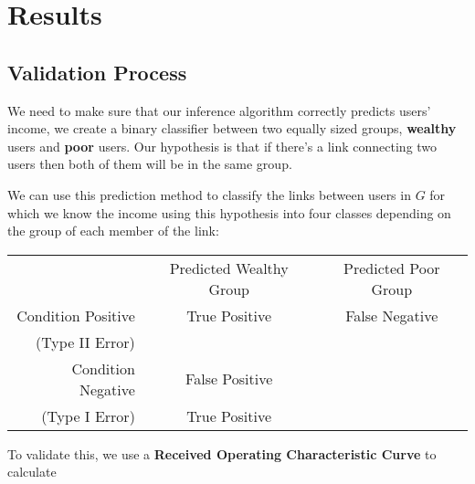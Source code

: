 \section{Results}

\subsection{Validation Process}

We need to make sure that our inference algorithm correctly predicts users' income, we create a binary classifier between two equally sized groups, \textbf{wealthy} users and \textbf{poor} users. Our hypothesis is that if there's a link connecting two users then both of them will be in the same group.

We can use this prediction method to classify the links between users in $ G $ for which we know the income using this hypothesis into four classes depending on the group of each member of the link:

\begin{tabularx}{\textwidth}{r|c|c}
& Predicted Wealthy Group & Predicted Poor Group \\
Condition Positive & True Positive & False Negative \tabularnewline (Type II Error) \\
Condition Negative & False Positive \tabularnewline (Type I Error) & True Positive
\end{tabularx}

To validate this, we use a \textbf{Received Operating Characteristic Curve} to calculate 